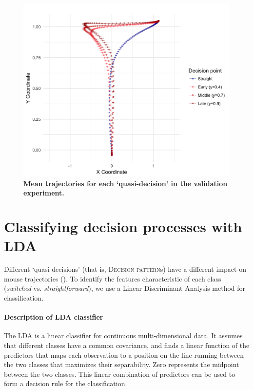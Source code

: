 \documentclass{article}
\begin{document}
\begin{figure}
\centering
\includegraphics[width=\textwidth]{calibration_mean_trajectory_pointchang.png}
\caption{\textbf{Mean trajectories for each `quasi-decision' in the validation experiment.}}\label{fig:mean.trajectories.calibration}
\end{figure}

\section{Classifying decision processes with LDA}
\label{section:LDA}
Different `quasi-decisions' (that is, \textsc{Decision pattern}s) have a different impact on mouse trajectories (). To identify the features characteristic of each class (\textit{switched} vs. \textit{straightforward}), we use a Linear Discriminant Analysis method for classification. 

\paragraph{Description of LDA classifier}
The LDA is a linear classifier for continuous multi-dimensional data. It assumes that different classes have a common covariance, and finds a linear function of the predictors that maps each observation to a position on the line running between the two classes that maximizes their separability. Zero represents the midpoint between the two classes. This linear combination of predictors can be used to form a decision rule for the classification.
 
\end{document}
